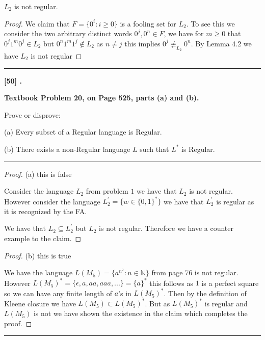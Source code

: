\documentclass[11pt,twoside]{article}
\newcounter{problem}
\newcommand{\problem}[1]{%
\refstepcounter{problem}\noindent\textbf{[#1] \arabic{problem}.}}
\newcommand{\solution}{\bigskip\hrule\bigskip}
\newcommand{\problembreak}{\bigskip\hrule\bigskip}
\begin{document}
$L_2$ is not regular. 

\begin{proof}
   We claim that $F=\{0^i:i\geq 0\}$ is a fooling set for $L_2$. To see this we consider the two arbitrary distinct words $0^j,0^n\in F$, we have for $m\geq 0$ that $0^j1^m0^j\in L_2$ but $0^n1^m1^j\not \in L_2$ as $n\not = j$ this implies $0^j\not \equiv_{L_2} 0^n$. By Lemma 4.2 we have $L_2$ is not regular
\end{proof}

\problembreak

\problem{50}
{\bfseries
Textbook Problem 20,
on Page 525,
parts (a) and (b).

Prove or disprove:

(a) Every subset of a Regular language is Regular.

(b) There exists a non-Regular language $L$ such that $L^*$ is Regular.
}

\solution


\begin{proof}{(a) this is false}

Consider the language $L_2$ from problem $1$ we have that $L_2$ is not regular. However consider the language $L_2^\prime=\{w\in \{0,1\}^*\}$ we have that $L_2^\prime$ is regular as it is recognized by the FA. 
\begin{center}
\end{center}
    We have that $L_2\subseteq L_2^\prime$ but $L_2$ is not regular. Therefore we have a counter example to the claim. 
\end{proof}
    
\begin{proof}{(b) this is true}

    We have the language $L(M_5)=\{a^{n^2}:n\in \mathbb{N}\}$ from page 76 is not regular. However $L(M_5)^*=\{\epsilon , a,aa,aaa,...\}=\{a\}^*$ this follows as $1$ is a perfect square so we can have any finite length of $a$'s in $L(M_5)^*$. Then by the definition of Kleene closure we have $L(M_5)\subset L(M_5)^*$. But as $L(M_5)^*$ is regular and $L(M_5)$ is not we have shown the existence in the claim which completes the proof. 
\end{proof}
    


\problembreak
\end{document}
